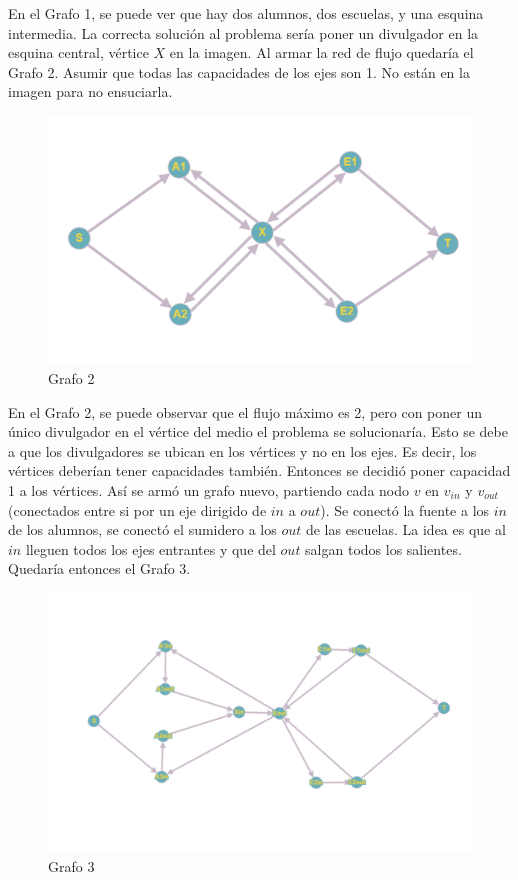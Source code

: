 En el Grafo 1, se puede ver que hay dos alumnos, dos escuelas, y una esquina intermedia. La correcta solución al problema sería poner un divulgador en la esquina central, vértice $X$ en la imagen. Al armar la red de flujo quedaría el Grafo 2. Asumir que todas las capacidades de los ejes son 1. No están en la imagen para no ensuciarla.

\begin{figure}[H]
\centering
\includegraphics[width=15cm]{Imagenes/Ej1c.png}
\caption{Grafo 2}
\end{figure}

En el Grafo 2, se puede observar que el flujo máximo es 2, pero con poner un único divulgador en el vértice del medio el problema se solucionaría. Esto se debe a que los divulgadores se ubican en los vértices y no en los ejes. Es decir, los vértices deberían tener capacidades también. Entonces se decidió poner capacidad 1 a los vértices. Así se armó un grafo nuevo, partiendo cada nodo $v$ en $v_{in}$ y $v_{out}$ (conectados entre si por un eje dirigido de $in$ a $out$). Se conectó la fuente a los $in$ de los alumnos, se conectó el sumidero a los $out$ de las escuelas. La idea es que al $in$ lleguen todos los ejes entrantes y que del $out$ salgan todos los salientes. Quedaría entonces el Grafo 3.

\begin{figure}[H]
\centering
\includegraphics[width=15cm]{Imagenes/Ej1b.png}
\caption{Grafo 3}
\end{figure}

